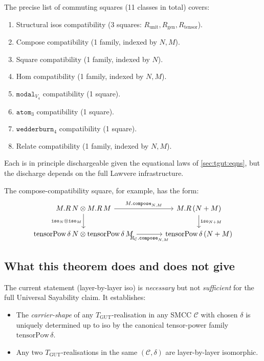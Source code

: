 \documentclass[11pt,a4paper]{article}
\theoremstyle{plain}
\theoremstyle{definition}
\theoremstyle{remark}
\newcommand{\TGUT}{T_{\mathrm{GUT}}}
\newcommand{\tensorPow}{\mathrm{tensorPow}}
\newcommand{\smcc}{SMCC}
\begin{document}
The precise list of commuting squares (11 classes in total) covers:
\begin{enumerate}[leftmargin=*]
\item Structural isos compatibility (3 squares: $R_{\mathrm{unit}}, R_{\mathrm{gen}}, R_{\mathrm{tensor}}$).
\item Compose compatibility (1 family, indexed by $N, M$).
\item Square compatibility (1 family, indexed by $N$).
\item Hom compatibility (1 family, indexed by $N, M$).
\item $\mathtt{modal}_{V_4}$ compatibility (1 square).
\item $\mathtt{atom}_3$ compatibility (1 square).
\item $\mathtt{wedderburn}_4$ compatibility (1 square).
\item Relate compatibility (1 family, indexed by $N, M$).
\end{enumerate}

Each is in principle dischargeable given the equational laws of \cref{sec:tgut:eqns}, but the discharge depends on the full Lawvere infrastructure.

The compose-compatibility square, for example, has the form:
\[
\begin{tikzcd}[column sep=large]
M.R\,N \otimes M.R\,M
  \arrow[r, "M.\mathtt{compose}_{N,M}"]
  \arrow[d, "\mathtt{iso}_N \otimes \mathtt{iso}_M"']
& M.R\,(N+M)
  \arrow[d, "\mathtt{iso}_{N+M}"] \\
\tensorPow\,\delta\,N \otimes \tensorPow\,\delta\,M
  \arrow[r, "R_{\mathcal{C}}.\mathtt{compose}_{N,M}"']
& \tensorPow\,\delta\,(N+M)
\end{tikzcd}
\]

\subsection{What this theorem does and does not give}\label{sec:us:scope}

The current statement (layer-by-layer iso) is \emph{necessary} but not \emph{sufficient} for the full Universal Sayability claim. It establishes:
\begin{itemize}[leftmargin=*]
\item The \emph{carrier-shape} of any $\TGUT$-realisation in any \smcc{} $\mathcal{C}$ with chosen $\delta$ is uniquely determined up to iso by the canonical tensor-power family $\tensorPow\,\delta$.
\item Any two $\TGUT$-realisations in the same $(\mathcal{C}, \delta)$ are layer-by-layer isomorphic.
\end{itemize}
\end{document}
